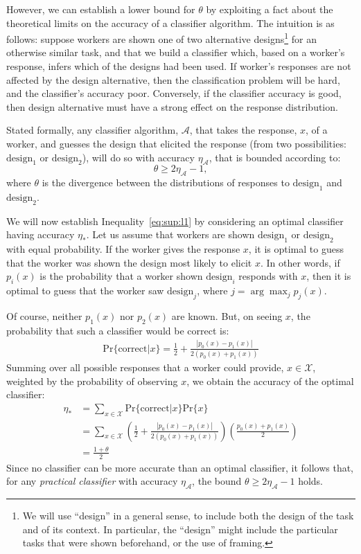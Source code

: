 \documentclass{sigchi}
\begin{document}
However, we can establish a lower bound for $\theta$ by 
exploiting a fact about the theoretical limits on the accuracy of a 
classifier algorithm.  The intuition is as follows: 
suppose workers are shown one of two alternative designs\footnote{We will
use ``design'' in a general sense, to include both the design of the task
and of its context.  In particular, the ``design'' might include the
particular tasks that were shown beforehand, or the use of framing.}
for an otherwise
similar task, and that we build a classifier which, 
based on a worker's response, infers which of the designs had been 
used.
If worker's responses are not affected by the design alternative,
then the classification problem will be hard, and the classifier's 
accuracy poor.
Conversely, if the classifier accuracy is good, then design alternative 
must have a strong effect on the response distribution.

Stated formally, any classifier algorithm, $\mathcal{A}$, that
takes the response, $x$, of a worker, and guesses the 
design that elicited the response (from two possibilities:
$\mathrm{design}_1$ or $\mathrm{design}_2$), will do so with accuracy 
$\eta_\mathcal{A}$, that is bounded according to:
\begin{equation}
	\theta \geq 2\eta_\mathcal{A} - 1,
	\label{eq:sup:l1}
\end{equation}
where $\theta$ is the divergence between the distributions of responses
to $\mathrm{design}_1$ and $\mathrm{design}_2$.

We will now establish Inequality~\ref{eq:sup:l1} by considering an
optimal classifier having accuracy $\eta_*$.  
Let us assume that workers are shown 
$\mathrm{design}_1$ or $\mathrm{design}_2$ with equal probability.
If the worker gives the response $x$, it is optimal to guess
that the worker was shown the design most likely to elicit $x$.
In other words, if $p_i(x)$ is the probability that a worker shown 
$\mathrm{design}_i$ responds with $x$, then it is optimal to 
guess that the worker saw $\mathrm{design}_j$, where 
$j = \arg\max_j{p_j(x)}$.

Of course, neither $p_1(x)$ nor $p_2(x)$ are known.  But, on seeing $x$,
the probability that such a classifier would be correct is:
\begin{align}
  \mathrm{Pr}\{\mathrm{correct}|x\} = \frac{1}{2} 
	+ \frac{|p_0(x) - p_1(x)|}{2(p_0(x) + p_1(x))}
\end{align}
Summing over all possible responses that a worker could provide, 
$x \in \mathcal{X}$, weighted by the probability of observing $x$, 
we obtain the accuracy of the optimal classifier:
\begin{align}
\eta_* 
  &= \sum_{x\in\mathcal{X}} 
	\mathrm{Pr}\{\mathrm{correct}|x\}\mathrm{Pr}\{x\} \\
  &= \sum_{x\in\mathcal{X}} 
	\left(
	\frac{1}{2} + \frac{|p_0(x) - p_1(x)|}{2(p_0(x) + p_1(x))}
  \right) \left( 
	\frac{p_0(x) + p_1(x)}{2} 
  \right) \\
  &= \frac{1 + \theta}{2}
\end{align}
Since no classifier can be more accurate than an optimal classifier,
it follows that, for any \textit{practical classifier} 
with accuracy $\eta_\mathcal{A}$, the bound 
$\theta \geq 2\eta_\mathcal{A} -1$ holds.
\end{document}
